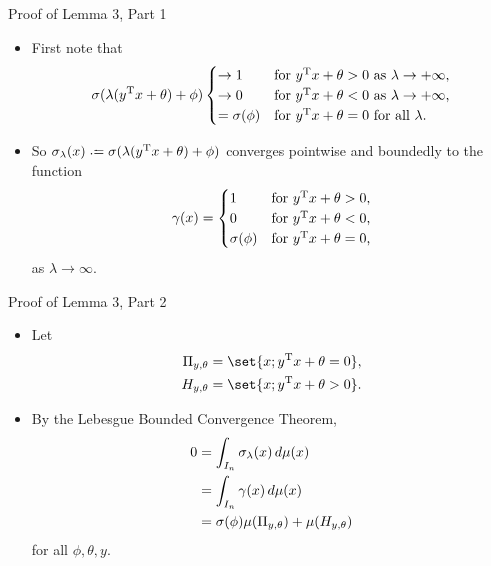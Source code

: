 \documentclass[11pt,letterpaper]{beamer}
\begin{document}
\begin{frame}{Proof of Lemma 3, Part 1}
  \begin{itemize}
  \item First note that
    \[
      \sigma(\lambda( y^{\mathrm{T}} x+\theta)+\phi)
      \begin{cases}
        \to 1&\text{for $ y^{\mathrm{T}} x+\theta>0$ as $\lambda\to+\infty$,}\\
        \to 0&\text{for $ y^{\mathrm{T}} x+\theta<0$ as $\lambda\to+\infty$,}\\
        =\sigma(\phi)&\text{for $ y^{\mathrm{T}} x+\theta=0$ for all $\lambda$.}
      \end{cases}
    \]
  \item So $\sigma_\lambda( x)\bdef\sigma(\lambda( y^\rmT x+\theta)+\phi)$
    converges pointwise and boundedly to the function
    \[
      \gamma( x)=\begin{cases}
        1&\text{for $ y^{\mathrm{T}} x+\theta>0$,}\\
        0&\text{for $ y^{\mathrm{T}} x+\theta<0$,}\\
        \sigma(\phi)&\text{for $ y^{\mathrm{T}} x+\theta=0$,}
      \end{cases}
    \]
    as $\lambda\to\infty$.
\end{itemize}
\end{frame}

\begin{frame}{Proof of Lemma 3, Part 2}
  \begin{itemize}
  \item Let
    \begin{align*}
      \Pi_{y,\theta}&=\set{x;y^\rmT x+\theta=0},\\
      H_{y,\theta}&=\set{x;y^\rmT x+\theta>0}.
      \end{align*}
  \item By the Lebesgue Bounded Convergence Theorem,
    \begin{align*}
      0&=\int_{I_n}\sigma_\lambda( x)\mathop{}\!d\mu( x)\\
       &=\int_{I_n}\gamma( x)\mathop{}\!d\mu( x)\\
       &=\sigma(\phi)\mu(\Pi_{ y,\theta})+\mu(H_{ y,\theta})
    \end{align*}
    for all $\phi,\theta, y$.
  \end{itemize}
\end{frame}
\end{document}
